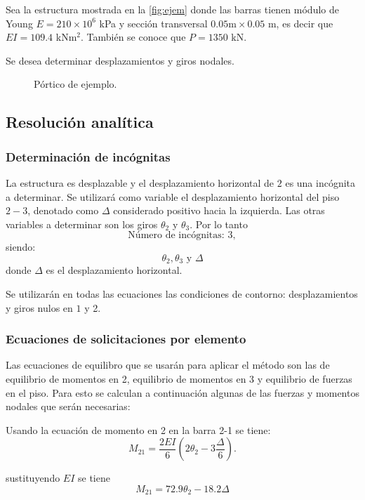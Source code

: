 Sea la estructura mostrada en la \autoref{fig:ejem} donde las barras tienen módulo de Young $E=210 \times 10^{6}$ kPa y sección transversal $0.05 \text{m} \times 0.05$ m, es decir que $EI=109.4 $ kNm$^2$. %
También se conoce que $P = 1350$ kN.



Se desea determinar desplazamientos y giros nodales. %

\begin{figure}[htb]
	\centering
	\def\svgwidth{0.5\textwidth}
	
	\caption{Pórtico de ejemplo.}
	\label{fig:ejem}
\end{figure}

\subsection{Resolución analítica}


\subsubsection{Determinación de incógnitas}
La estructura es desplazable y el desplazamiento horizontal de $2$ es una incógnita a determinar. %
%
Se utilizará como variable el desplazamiento horizontal del piso $2-3$, denotado como $\Delta$ considerado positivo hacia la izquierda. %
%
Las otras variables a determinar son los giros $\theta_2$ y $\theta_3$. %
Por lo tanto 
$$
\boxed{\text{Número de incógnitas: } 3},
$$
siendo:
$$
\boxed{
 \theta_2, \theta_3 \text{ y } \Delta}
$$
donde $\Delta$ es el desplazamiento horizontal.


Se utilizarán en todas las ecuaciones las condiciones de contorno: desplazamientos y giros nulos en $1$ y 2.


\subsubsection{Ecuaciones de solicitaciones por elemento}

Las ecuaciones de equilibro que se usarán para aplicar el método son las de equilibrio de momentos en 2, equilibrio de momentos en 3 y equilibrio de fuerzas en el piso. Para esto se calculan a continuación algunas de las fuerzas y momentos nodales que serán necesarias:

Usando la ecuación de momento en 2 en la barra 2-1 se tiene:
$$
	M_{21} = \frac{2EI}{6} ( 2\theta_2 - 3 \frac{ \Delta } {6} ).
$$

sustituyendo $EI$ se tiene%
\begin{equation}
\boxed{
M_{21}  = 72.9 \theta_2 - 18.2 \Delta}
\end{equation}
 
